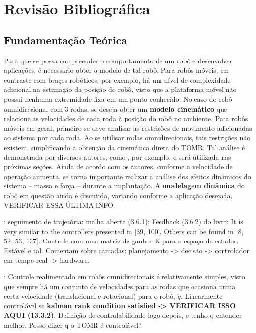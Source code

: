 \section{Revisão Bibliográfica}
\label{sec:revbib}

\subsection{Fundamentação Teórica}

Para que se possa compreender o comportamento de um robô e desenvolver aplicações, é necessário obter o modelo de tal robô. Para robôs móveis, em contraste com braços robóticos, por exemplo, há um nível de complexidade adicional na estimação da posição do robô, visto que a plataforma móvel não possui nenhuma extremidade fixa em um ponto conhecido. No caso do robô omnidirecional com 3 rodas, se deseja obter um \textbf{modelo cinemático} que relacione as velocidades de cada roda à posição do robô no ambiente. Para robôs móveis em geral, primeiro se deve analisar as restrições de movimento adicionadas ao sistema por cada roda. Ao se utilisar rodas omnidirecionais, tais restrições não existem, simplificando a obtenção da cinemática direta do TOMR. Tal análise é demonstrada por diversos autores, como \cite{siegwart2011introduction}, por exemplo, e será utilizada nas próximas seções. Ainda de acordo com os autores, conforme a velocidade de operação aumenta, se torna importante realizar a análise dos efeitos dinâmicos do sistema -- massa e força -- durante a implantação. A \textbf{modelagem dinâmica} do robô em questão ainda é discutida, variando conforme a aplicação desejada. VERIFICAR ESSA ÚLTIMA INFO.

\cite{siegwart2011introduction}: seguimento de trajetória: malha aberta (3.6.1); Feedback (3.6.2) do livro: It is very similar to the controllers presented in [39, 100]. Others can be found in [8, 52, 53, 137]. Controle com uma matriz de ganhos K para o espaço de estados. Estável e tal. Comentam sobre camadas: planejamento -> decisão -> controlador em tempo real -> hardware.

\cite{lynch2017modern}: Controle realimentado em robôs omnidirecionais é relativamente simples, visto que sempre há um conjunto de velocidades para as rodas que ocasiona numa certa velocidade (translacional e rotacional) para o robô, $\dot{q}$. Linearmente controlável se \textbf{kalman rank condition satisfied -> VERIFICAR ISSO AQUI (13.3.2)}. Definição de controlabilidade logo depois, e tenho q entender melhor. Posso dizer q o TOMR é controlável?

